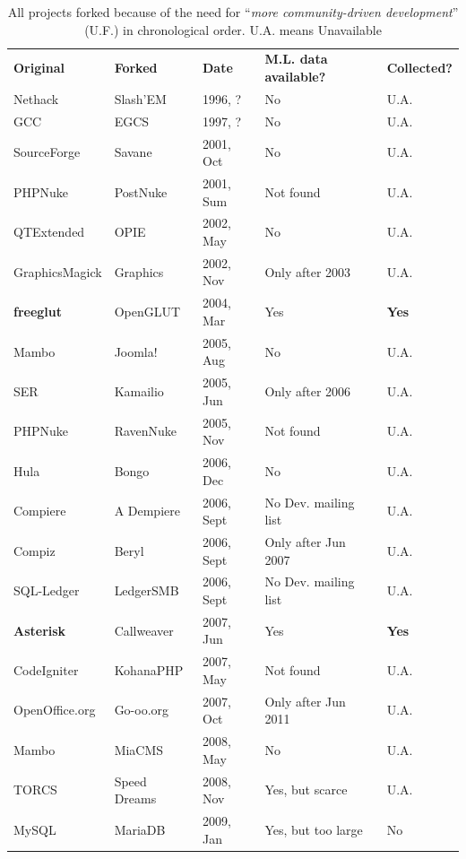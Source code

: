 \documentclass{report}
\begin{document}
\begin{table} [H]
\centering
\caption{All projects forked because of the need for ``\textit{more community-driven development}'' (U.F.) \cite{Robles} in chronological order. U.A. means Unavailable}
\label{tableProjectsForkedCat2CommunityDriven}
\begin{tabular}{m{} m{} m{} m{} m{}}
\hline\noalign{\smallskip}
\textbf{Original} & \textbf{Forked} & \textbf{Date} & \textbf{M.L. data available?} & \textbf{Collected?}\\
\noalign{\smallskip}\hline\noalign{\smallskip}
Nethack & Slash'EM & 1996, ? & No & U.A. \\ \hline
GCC & EGCS & 1997, ? & No & U.A. \\ \hline
SourceForge & Savane & 2001, Oct & No & U.A. \\ \hline
PHPNuke & PostNuke & 2001, Sum & Not found & U.A. \\ \hline
QTExtended & OPIE & 2002, May & No & U.A. \\ \hline
GraphicsMagick & Graphics & 2002, Nov  & Only after 2003 & U.A. \\ \hline
\textbf{freeglut} & OpenGLUT & 2004, Mar & Yes & \textbf{Yes} \\ \hline
Mambo & Joomla! & 2005, Aug & No & U.A. \\ \hline
SER & Kamailio & 2005, Jun & Only after 2006 & U.A. \\ \hline
PHPNuke & RavenNuke & 2005, Nov & Not found & U.A. \\ \hline
Hula & Bongo & 2006, Dec & No & U.A. \\ \hline
Compiere & A Dempiere & 2006, Sept & No Dev. mailing list & U.A. \\ \hline
Compiz & Beryl & 2006, Sept & Only after Jun 2007 & U.A. \\ \hline
SQL-Ledger & LedgerSMB & 2006, Sept & No Dev. mailing list & U.A. \\ \hline
\textbf{Asterisk} & Callweaver & 2007, Jun & Yes & \textbf{Yes} \\ \hline
CodeIgniter & KohanaPHP & 2007, May & Not found & U.A. \\ \hline
OpenOffice.org & Go-oo.org & 2007, Oct & Only after Jun 2011 & U.A. \\ \hline
Mambo & MiaCMS & 2008, May & No & U.A. \\ \hline
TORCS & Speed Dreams & 2008, Nov & Yes, but scarce & U.A. \\ \hline
MySQL & MariaDB & 2009, Jan & Yes, but too large & No\\ \hline

\end{tabular}
\end{table}
\end{document}
